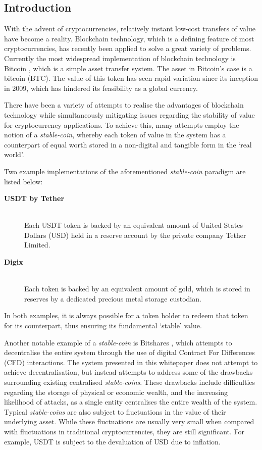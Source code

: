 \setlength{\columnsep}{20pt}
\begin{multicols}{2}

\section{Introduction}

With the advent of cryptocurrencies, relatively instant low-cost transfers of value have become a reality. Blockchain technology, which is a defining feature of most cryptocurrencies, has recently been applied to solve a great variety of problems. Currently the most widespread implementation of blockchain technology is Bitcoin \cite{Nakamoto2008}, which is a simple asset transfer system. The asset in Bitcoin's case is a bitcoin (BTC). The value of this token has seen rapid variation since its inception in 2009, which has hindered its feasibility as a global currency.

There have been a variety of attempts to realise the advantages of blockchain technology while simultaneously mitigating issues regarding the stability of value for cryptocurrency applications. To achieve this, many attempts employ the notion of a \textit{stable-coin}, whereby each token of value in the system has a counterpart of equal worth stored in a non-digital and tangible form in the `real world'.

Two example implementations of the aforementioned \textit{stable-coin} paradigm are listed below:
\begin{description}
	\item[{\bf USDT by Tether\cite{Tether.to2014}}] \hfill \\
		Each USDT token is backed by an equivalent amount of United States Dollars (USD) held in a reserve account by the private company Tether Limited.
	\item[{\bf Digix\cite{Djie2016}}] \hfill \\
		Each token is backed by an equivalent amount of gold, which is stored in reserves by a dedicated precious metal storage custodian.  
\end{description}

In both examples, it is always possible for a token holder to redeem that token for its counterpart, thus ensuring its fundamental `stable' value.

Another notable example of a \textit{stable-coin} is Bitshares \cite{Larimer2015}, which attempts to decentralise the entire system through the use of digital Contract For Differences (CFD) \cite{CFD} interactions. The system presented in this whitepaper does not attempt to achieve decentralisation, but instead attempts to address some of the drawbacks surrounding existing centralised \textit{stable-coins}. These drawbacks include difficulties regarding the storage of physical or economic wealth, and the increasing likelihood of attacks, as a single entity centralises the entire wealth of the system. Typical \textit{stable-coins} are also subject to fluctuations in the value of their underlying asset. While these fluctuations are usually very small when compared with fluctuations in traditional cryptocurrencies, they are still significant. For example, USDT is subject to the devaluation of USD due to inflation.


\end{multicols}
